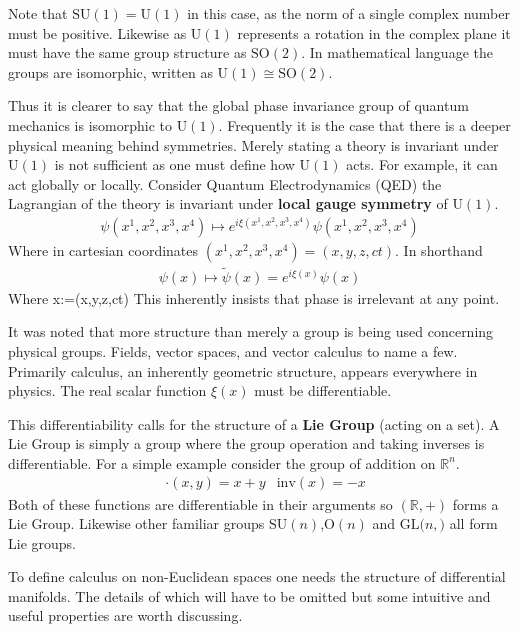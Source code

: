 \documentclass[twocolumn,floatfix,aps,prd,amsmath,amssymb]{revtex4}
\begin{document}
Note that $\mathrm{SU}(1)=\mathrm{U}(1)$ in this case, as the norm of a single complex number must be positive. Likewise as $\mathrm{U}(1)$ represents a rotation in the complex plane it must have the same group structure as $\mathrm{SO}(2)$. In mathematical language the groups are isomorphic, written as $\mathrm{U}(1) \cong \mathrm{SO}(2)$.

Thus it is clearer to say that the global phase invariance group of quantum mechanics is isomorphic to $\mathrm{U}(1)$. Frequently it is the case that there is a deeper physical meaning behind symmetries. Merely stating a theory is invariant under $\mathrm{U}(1)$ is not sufficient as one must define how $\mathrm{U}(1)$ acts. For example, it can act globally or locally.
\newpage
Consider Quantum Electrodynamics (QED) the Lagrangian of the theory is invariant under \textbf{local gauge symmetry} of $\mathrm{U}(1)$.
\begin{align*}
\psi(x^1,x^2,x^3,x^4) \mapsto e^{i \xi(x^1,x^2,x^3,x^4)} \psi(x^1,x^2,x^3,x^4)
\end{align*}
Where in cartesian coordinates $(x^1,x^2,x^3,x^4)=(x,y,z,ct)$. In shorthand
\begin{align*}
\psi(x) \mapsto  \tilde{\psi}(x)=e^{i \xi(x)} \psi(x)
\end{align*}
Where x:=(x,y,z,ct) This inherently insists that phase is irrelevant at any point. 


It was noted that more structure than merely a group is being used  concerning physical groups. Fields, vector spaces, and vector calculus to name a few. Primarily calculus, an inherently geometric structure, appears everywhere in physics. The real scalar function $\xi(x)$ must be differentiable.

This differentiability calls for the structure of a \textbf{Lie Group} (acting on a set). A Lie Group is simply a group where the group operation and taking inverses is differentiable. For a simple example consider the group of addition on $\mathbb{R}^n$.
\begin{align*}
&\cdot(x,y) = x+y &\mathrm{inv}(x) = -x
\end{align*}
Both of these functions are differentiable in their arguments so $(\mathbb{R},+)$ forms a Lie Group. Likewise other familiar groups $\mathrm{SU}(n)$,$\mathrm{O}(n)$ and $\mathrm{GL}(n,\mathrm)$ all form Lie groups.

To define calculus on non-Euclidean spaces one needs the structure of differential manifolds. The details of which will have to be omitted but some intuitive and useful properties are worth discussing.
\end{document}
